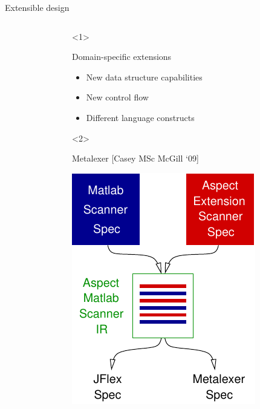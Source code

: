 \begin{frame}[t]{Extensible design}
\begin{columns}[T]
\begin{column}{5cm}
    \end{column}
    \begin{column}{5cm}
      \begin{onlyenv}<1>
        \begin{block}{Domain-specific extensions}
          \begin{itemize}
          \item New data structure capabilities
          \item New control flow
          \item Different language constructs
          \end{itemize}
        \end{block}
      \end{onlyenv}
      \begin{onlyenv}<2>
        \begin{block}{Metalexer {\tiny[Casey MSc McGill `09]}
          \vspace{1ex}}
          \begin{center}
            \includegraphics[scale=0.7]{images/metalexer.pdf}
          \end{center}


\end{block}
\end{onlyenv}
\end{column}
\end{columns}
\end{frame}
